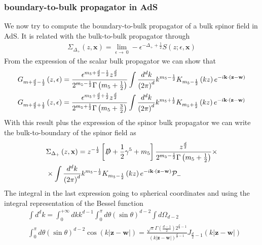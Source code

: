 \documentclass[12pt,a4paper]{article}
\begin{document}
\subsubsection{boundary-to-bulk propagator in AdS}
We now try to compute the boundary-to-bulk propagator of a bulk spinor field in AdS. It is related with the bulk-to-bulk propagator through
\begin{align}
    \Sigma_{\Delta_{+}} \left(z, \mathbf{x}\right) =  \lim_{\epsilon \to \ 0} - \epsilon^{-\Delta_{+} + \frac{1}{2}} S \left(z; \epsilon, \mathbf{x} \right)
\end{align}
From the expression of the scalar bulk propagator we can show that
\begin{align}
    & G_{m+\frac{d}{2} - \frac{1}{2}} \left(z, \epsilon \right) = \frac{\epsilon^{m_5 + \frac{d}{2} - \frac{1}{2}} z^{\frac{d}{2}} }{2^{m_5-\frac{1}{2}} \Gamma\left( m_5 + \frac{1}{2} \right)} \int \frac{d^d k}{{\left( 2 \pi \right)}^d} k^{m_5 - \frac{1}{2}} K_{m_5 - \frac{1}{2}}\left( k z \right) e^{- i \mathbf{k} \cdot \left( \mathbf{z} - \mathbf{w} \right)} \\
    & G_{m+\frac{d}{2} + \frac{1}{2}} \left(z, \epsilon \right) = \frac{\epsilon^{m_5 + \frac{d}{2} + \frac{1}{2}} z^{\frac{d}{2}} }{2^{m_5+\frac{1}{2}} \Gamma\left( m_5 + \frac{3}{2} \right)} \int \frac{d^d k}{{\left( 2 \pi \right)}^d} k^{m_5 + \frac{1}{2}} K_{m_5 + \frac{1}{2}}\left( k z \right) e^{- i \mathbf{k} \cdot \left( \mathbf{z} - \mathbf{w} \right)} \notag
\end{align}
With this result plus the expression of the spinor bulk propagator we can write the bulk-to-boundary of the spinor field as
\begin{align}
    & \Sigma_{\Delta_{+}} \left(z, \mathbf{x}\right) = z^{-\frac{1}{2}} \left[ \slashed{D} + \frac{1}{2}\gamma^5+ m_5 \right] \frac{z^{\frac{d}{2}}}{2^{m_5 - \frac{1}{2}}\Gamma\left( m_5 + \frac{1}{2} \right)} \times \\
    & \times  \int \frac{d^d k}{{\left( 2 \pi \right)}^d} k^{m_5 - \frac{1}{2}} K_{m_5 - \frac{1}{2}} \left( k z \right) e^{-i \mathbf{k} \cdot \left( \mathbf{z} - \mathbf{w} \right)} \mathcal{P}_{-} \notag
\end{align}
The integral in the last expression going to spherical coordinates and using the integral representation of the Bessel function
\begin{align}
   &\int d^d k = \int_0^{+ \infty} dk k^{d-1} \int_0^{\pi} d\theta {\left(\sin \theta\right)}^{d-2} \int d \Omega_{d-2} \\
   &\int_{0}^\pi d\theta {\left( \sin \theta \right)}^{d-2} \cos \left( k \left| \mathbf{z} - \mathbf{w} \right| \right) = \frac{\sqrt{\pi} \Gamma\left(\frac{d-1}{2}\right)2^{\frac{d}{2}-1}}{{\left(k \left| \mathbf{z} - \mathbf{w} \right| \right)}^{\frac{d}{2}-1}} J_{\frac{d}{2}-1} \left( k \left| \mathbf{z} - \mathbf{w} \right| \right)
\end{align}
\end{document}
